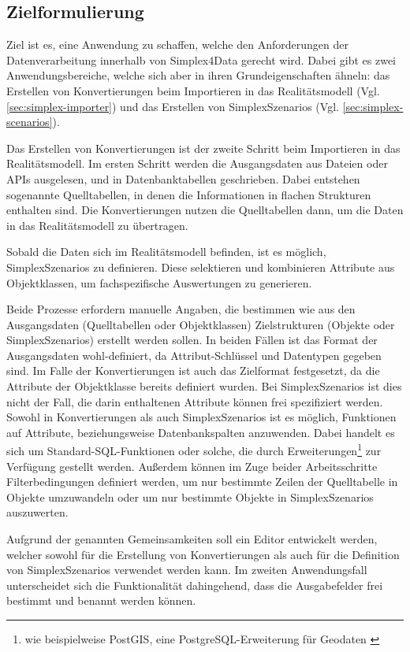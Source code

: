 \subsection{Zielformulierung}

Ziel ist es, eine Anwendung zu schaffen, welche den Anforderungen der Datenverarbeitung innerhalb von Simplex4Data gerecht wird. Dabei gibt es zwei Anwendungsbereiche, welche sich aber in ihren Grundeigenschaften ähneln: das Erstellen von Konvertierungen beim Importieren in das Realitätsmodell (Vgl. \ref{sec:simplex-importer}) und das Erstellen von SimplexSzenarios (Vgl. \ref{sec:simplex-scenarios}).

Das Erstellen von Konvertierungen ist der zweite Schritt beim Importieren in das Realitätsmodell. Im ersten Schritt werden die Ausgangsdaten aus Dateien oder APIs ausgelesen, und in Datenbanktabellen geschrieben. Dabei entstehen sogenannte Quelltabellen, in denen die Informationen in flachen Strukturen enthalten sind. Die Konvertierungen nutzen die Quelltabellen dann, um die Daten in das Realitätsmodell zu übertragen.

Sobald die Daten sich im Realitätsmodell befinden, ist es möglich, SimplexSzenarios zu definieren. Diese selektieren und kombinieren Attribute aus Objektklassen, um fachspezifische Auswertungen zu generieren.

Beide Prozesse erfordern manuelle Angaben, die bestimmen wie aus den Ausgangsdaten (Quelltabellen oder Objektklassen) Zielstrukturen (Objekte oder SimplexSzenarios) erstellt werden sollen. In beiden Fällen ist das Format der Ausgangsdaten wohl-definiert, da Attribut-Schlüssel und Datentypen gegeben sind. Im Falle der Konvertierungen ist auch das Zielformat festgesetzt, da die Attribute der Objektklasse bereits definiert wurden. Bei SimplexSzenarios ist dies nicht der Fall, die darin enthaltenen Attribute können frei spezifiziert werden. Sowohl in Konvertierungen als auch SimplexSzenarios ist es möglich, Funktionen auf Attribute, beziehungsweise Datenbankspalten anzuwenden. Dabei handelt es sich um Standard-\ac{SQL}-Funktionen oder solche, die durch Erweiterungen\footnote{wie beispielweise PostGIS, eine PostgreSQL-Erweiterung für Geodaten \parencite{postgispscPostGIS}} zur Verfügung gestellt werden. Außerdem können im Zuge beider Arbeitsschritte Filterbedingungen definiert werden, um nur bestimmte Zeilen der Quelltabelle in Objekte umzuwandeln oder um nur bestimmte Objekte in SimplexSzenarios auszuwerten.

Aufgrund der genannten Gemeinsamkeiten soll ein Editor entwickelt werden, welcher sowohl für die Erstellung von Konvertierungen als auch für die Definition von SimplexSzenarios verwendet werden kann. Im zweiten Anwendungsfall unterscheidet sich die Funktionalität dahingehend, dass die Ausgabefelder frei bestimmt und benannt werden können.

